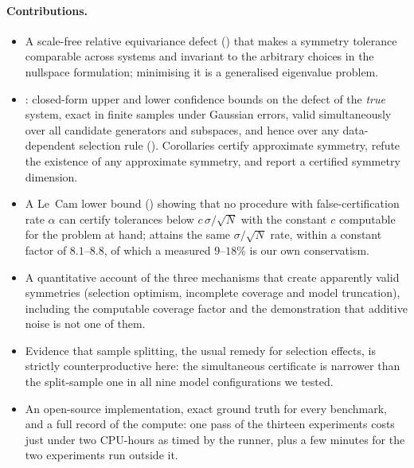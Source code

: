 \paragraph{Contributions.}
\begin{itemize}\itemsep2pt
\item A scale-free relative equivariance defect () that makes a
  symmetry tolerance comparable across systems and invariant to the arbitrary
  choices in the nullspace formulation; minimising it is a generalised
  eigenvalue problem.
\item \symcert: closed-form upper and lower confidence bounds on the defect of
  the \emph{true} system, exact in finite samples under Gaussian errors, valid
  simultaneously over all candidate generators and subspaces, and hence over any
  data-dependent selection rule ().
  Corollaries certify approximate symmetry, refute the existence of any
  approximate symmetry, and report a certified symmetry dimension.
\item A Le~Cam lower bound () showing that no procedure with
  false-certification rate $\alpha$ can certify tolerances below
  $c\,\sigma/\sqrt{N}$ with the constant $c$ computable for the problem at hand;
  \symcert{} attains the same $\sigma/\sqrt N$ rate, within a constant factor
  of $8.1$--$8.8$, of which a measured $9$--$18\%$ is our own conservatism.
\item A quantitative account of the three mechanisms that create apparently
  valid symmetries (selection optimism, incomplete coverage and model truncation), including the computable coverage factor and the demonstration that additive noise is not one of them.
\item Evidence that sample splitting, the usual remedy for selection effects, is
  strictly counterproductive here: the simultaneous certificate is narrower than
  the split-sample one in all nine model configurations we tested.
\item An open-source implementation, exact ground truth for every benchmark, and
  a full record of the compute: one pass of the thirteen experiments costs just
  under two CPU-hours as timed by the runner, plus a few minutes for the two
  experiments run outside it.
\end{itemize}

